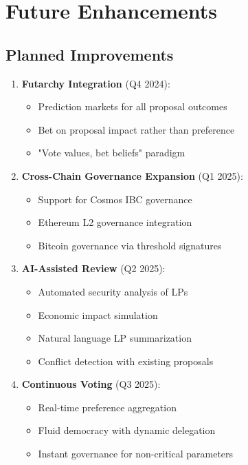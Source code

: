 \section{Future Enhancements}


\subsection{Planned Improvements}

\begin{enumerate}
\item \textbf{Futarchy Integration} (Q4 2024):
\begin{itemize}
\item Prediction markets for all proposal outcomes
\item Bet on proposal impact rather than preference
\item "Vote values, bet beliefs" paradigm
\end{itemize}

\item \textbf{Cross-Chain Governance Expansion} (Q1 2025):
\begin{itemize}
\item Support for Cosmos IBC governance
\item Ethereum L2 governance integration
\item Bitcoin governance via threshold signatures
\end{itemize}

\item \textbf{AI-Assisted Review} (Q2 2025):
\begin{itemize}
\item Automated security analysis of LPs
\item Economic impact simulation
\item Natural language LP summarization
\item Conflict detection with existing proposals
\end{itemize}

\item \textbf{Continuous Voting} (Q3 2025):
\begin{itemize}
\item Real-time preference aggregation
\item Fluid democracy with dynamic delegation
\item Instant governance for non-critical parameters
\end{itemize}
\end{enumerate}

